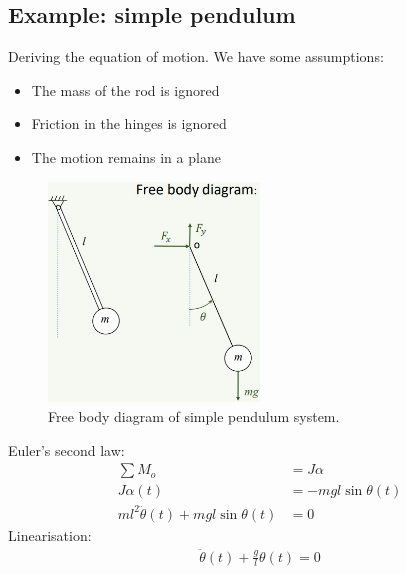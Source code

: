 \subsection{Example: simple pendulum}
Deriving the equation of motion. We have some assumptions:
\begin{itemize}
    \item The mass of the rod is ignored
    \item Friction in the hinges is ignored
    \item The motion remains in a plane
\end{itemize}
\begin{figure}[H]
    \centering
    \includegraphics[width = 0.5\textwidth]{./img/diagram11.jpg}
    \caption{Free body diagram of simple pendulum system.}
\end{figure}
Euler's second law:
\begin{align}
    \sum M_o                                    & = J \alpha             \\
    J \alpha(t)                                 & = - mgl\sin \theta (t) \\
    ml^2 \ddot{\theta} (t) + mgl\sin \theta (t) & = 0
\end{align}
Linearisation:
\begin{align}
    \ddot{\theta} (t) + \frac{g}{l}\theta(t) =0
\end{align}
